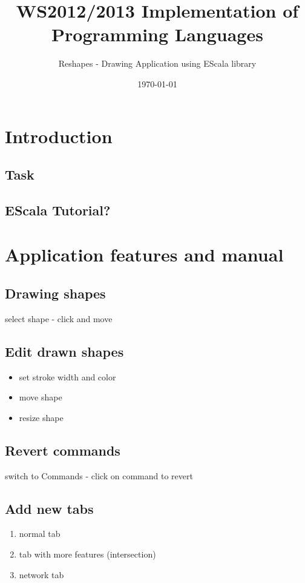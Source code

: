 \documentclass[12pt, accentcolor=tud9c, linedtoc, bigchapter, colorback, noresetcounter, numbersubsubsec]{tudreport}
\date{\today}
\title{WS2012/2013 Implementation of Programming Languages}
\subtitle{Reshapes - Drawing Application using EScala library}
\begin{document}
\maketitle
\tableofcontents

\chapter{Introduction}

\section{Task}

\section{EScala Tutorial?}

\chapter{Application features and manual}

\section{Drawing shapes}

select shape - click and move

\section{Edit drawn shapes}

\begin{itemize}
    \item set stroke width and color
    \item move shape
    \item resize shape
\end{itemize}

\section{Revert commands}

switch to Commands - click on command to revert

\section{Add new tabs}

\begin{enumerate}
    \item normal tab
    \item tab with more features (intersection)
    \item network tab
\end{enumerate}
\end{document}
